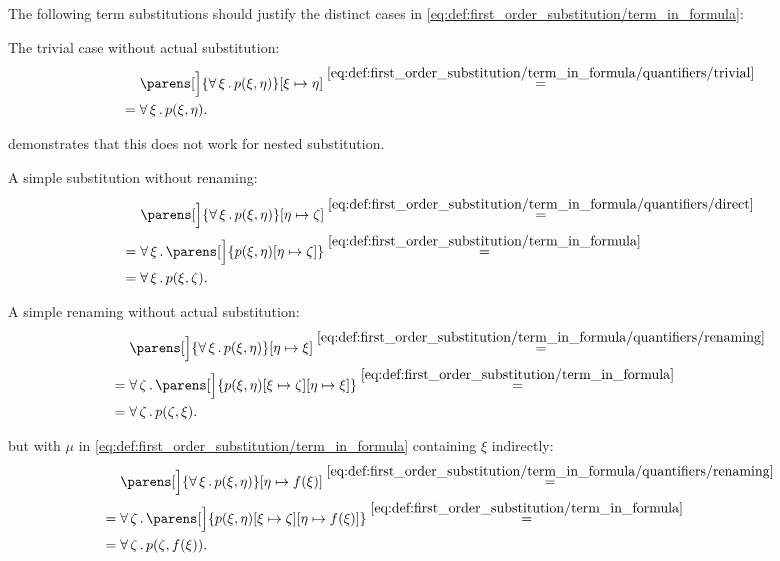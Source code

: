 \begin{example}\label{ex:first_order_substitution}
  The following term substitutions should justify the distinct cases in \eqref{eq:def:first_order_substitution/term_in_formula}:
  \begin{thmenum}
     The trivial case without actual substitution:
    \begin{align*}
      &\phantom{{}={}}
      \parens[\Big]{\qforall \xi p(\xi, \eta)}[\xi \mapsto \eta]
      \overset {\eqref{eq:def:first_order_substitution/term_in_formula/quantifiers/trivial}} = \\ &=
      \qforall \xi p(\xi, \eta).
    \end{align*}

     demonstrates that this does not work for nested substitution.

     A simple substitution without renaming:
    \begin{align*}
      &\phantom{{}={}}
      \parens[\Big]{\qforall \xi p(\xi, \eta)}[\eta \mapsto \zeta]
      \overset {\eqref{eq:def:first_order_substitution/term_in_formula/quantifiers/direct}} = \\ &=
      \qforall \xi \parens[\Big]{p(\xi, \eta)[\eta \mapsto \zeta]}
      \overset {\eqref{eq:def:first_order_substitution/term_in_formula}} = \\ &=
      \qforall \xi p(\xi, \zeta).
    \end{align*}

     A simple renaming without actual substitution:
    \begin{align*}
      &\phantom{{}={}}
      \parens[\Big]{\qforall \xi p(\xi, \eta)}[\eta \mapsto \xi]
      \overset {\eqref{eq:def:first_order_substitution/term_in_formula/quantifiers/renaming}} = \\ &=
      \qforall \zeta \parens[\Big]{p(\xi, \eta)[\xi \mapsto \zeta][\eta \mapsto \xi]}
      \overset {\eqref{eq:def:first_order_substitution/term_in_formula}} = \\ &=
      \qforall \zeta p(\zeta, \xi).
    \end{align*}

      but with \( \mu \) in \eqref{eq:def:first_order_substitution/term_in_formula} containing \( \xi \) indirectly:
    \begin{align*}
      &\phantom{{}={}}
      \parens[\Big]{\qforall \xi p(\xi, \eta)}[\eta \mapsto f(\xi)]
      \overset {\eqref{eq:def:first_order_substitution/term_in_formula/quantifiers/renaming}} = \\ &=
      \qforall \zeta \parens[\Big]{p(\xi, \eta)[\xi \mapsto \zeta][\eta \mapsto f(\xi)]}
      \overset {\eqref{eq:def:first_order_substitution/term_in_formula}} = \\ &=
      \qforall \zeta p(\zeta, f(\xi)).
    \end{align*}


\end{thmenum}
\end{example}

